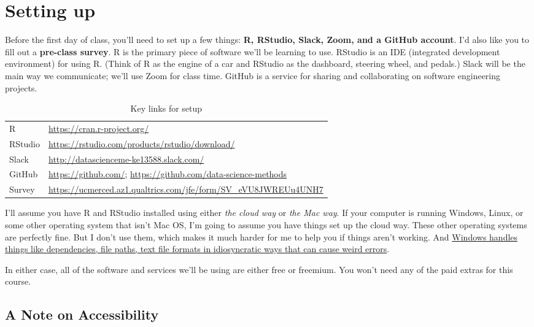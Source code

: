 \documentclass[
]{article}
\begin{document}
\hypertarget{setting-up}{%
\section*{Setting up}\label{setting-up}}

Before the first day of class, you'll need to set up a few things: \textbf{R, RStudio, Slack, Zoom, and a GitHub account}. I'd also like you to fill out a \textbf{pre-class survey}. R is the primary piece of software we'll be learning to use. RStudio is an IDE (integrated development environment) for using R. (Think of R as the engine of a car and RStudio as the dashboard, steering wheel, and pedals.) Slack will be the main way we communicate; we'll use Zoom for class time. GitHub is a service for sharing and collaborating on software engineering projects.

\begin{longtable}[]{@{}ll@{}}
\caption{Key links for setup}\tabularnewline
\toprule
\endhead
R & \url{https://cran.r-project.org/}\tabularnewline
RStudio & \url{https://rstudio.com/products/rstudio/download/}\tabularnewline
Slack & \url{http://datascienceme-ke13588.slack.com/}\tabularnewline
GitHub & \url{https://github.com/}; \url{https://github.com/data-science-methods}\tabularnewline
Survey & \url{https://ucmerced.az1.qualtrics.com/jfe/form/SV_eVU8JWREUu4UNH7}\tabularnewline
\bottomrule
\end{longtable}

I'll assume you have R and RStudio installed using either \emph{the cloud way} or \emph{the Mac way}. If your computer is running Windows, Linux, or some other operating system that isn't Mac OS, I'm going to assume you have things set up the cloud way. These other operating systems are perfectly fine. But I don't use them, which makes it much harder for me to help you if things aren't working. And \href{https://www.jimhester.com/post/2020-08-20-best-os-for-r/}{Windows handles things like dependencies, file paths, text file formats in idiosyncratic ways that can cause weird errors}.

In either case, all of the software and services we'll be using are either free or freemium. You won't need any of the paid extras for this course.

\hypertarget{a-note-on-accessibility}{%
\subsection{A Note on Accessibility}\label{a-note-on-accessibility}}
\end{document}
